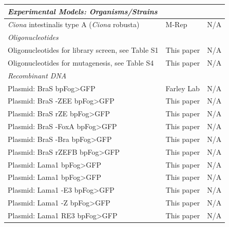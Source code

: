 \begin{landscape}
\begin{longtable}{p{} p{} p{}}
        \hline \textit{Experimental Models: Organisms/Strains} \\ \hline
        \textit{Ciona} intestinalis type A (\textit{Ciona} robusta) & M-Rep & N/A \\

        \hline \textit{Oligonucleotides} \\ \hline
        Oligonucleotides for library screen, see Table S1 & This paper & N/A \\
        Oligonucleotides for mutagenesis, see Table S4 & This paper & N/A \\

        \hline \textit{Recombinant DNA} \\ \hline
        Plasmid: BraS bpFog>GFP & Farley Lab & N/A \\ 
        Plasmid: BraS -ZEE bpFog>GFP & This paper & N/A \\
        Plasmid: BraS rZE bpFog>GFP & This paper & N/A \\
        Plasmid: BraS -FoxA bpFog>GFP & This paper & N/A \\
        Plasmid: BraS -Bra bpFog>GFP & This paper & N/A \\ 
        Plasmid: BraS rZEFB bpFog>GFP & This paper & N/A \\
        Plasmid: Lama1 bpFog>GFP & This paper & N/A \\
        Plasmid: Lama1 bpFog>GFP & This paper & N/A \\
        Plasmid: Lama1 -E3 bpFog>GFP & This paper & N/A \\
        Plasmid: Lama1 -Z bpFog>GFP & This paper & N/A \\
        Plasmid: Lama1 RE3 bpFog>GFP & This paper & N/A \\


\end{longtable}
\end{landscape}
